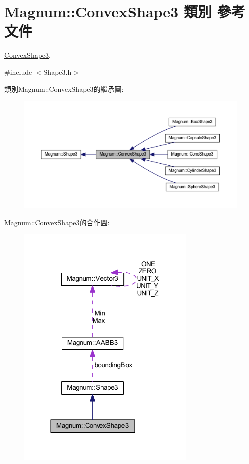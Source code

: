 \hypertarget{class_magnum_1_1_convex_shape3}{}\section{Magnum\+:\+:Convex\+Shape3 類別 參考文件}
\label{class_magnum_1_1_convex_shape3}


\hyperlink{class_magnum_1_1_convex_shape3}{Convex\+Shape3}.  




{\ttfamily \#include $<$Shape3.\+h$>$}



類別\+Magnum\+:\+:Convex\+Shape3的繼承圖\+:\nopagebreak
\begin{figure}[H]
\begin{center}
\leavevmode
\includegraphics[width=350pt]{class_magnum_1_1_convex_shape3__inherit__graph}
\end{center}
\end{figure}


Magnum\+:\+:Convex\+Shape3的合作圖\+:\nopagebreak
\begin{figure}[H]
\begin{center}
\leavevmode
\includegraphics[width=242pt]{class_magnum_1_1_convex_shape3__coll__graph}
\end{center}
\end{figure}
